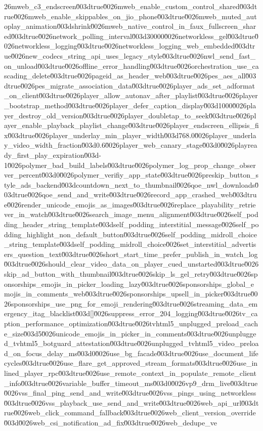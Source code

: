 {26mweb_c3_endscreen\u003dtrue\u0026mweb_enable_custom_control_shared\u003dtrue\u0026mweb_enable_skippables_on_jio_phone\u003dtrue\u0026mweb_muted_autoplay_animation\u003dshrink\u0026mweb_native_control_in_faux_fullscreen_shared\u003dtrue\u0026network_polling_interval\u003d30000\u0026networkless_gel\u003dtrue\u0026networkless_logging\u003dtrue\u0026networkless_logging_web_embedded\u003dtrue\u0026new_codecs_string_api_uses_legacy_style\u003dtrue\u0026nwl_send_fast_on_unload\u003dtrue\u0026offline_error_handling\u003dtrue\u0026orchestration_use_cascading_delete\u003dtrue\u0026pageid_as_header_web\u003dtrue\u0026pes_aes_all\u003dtrue\u0026pes_migrate_association_data\u003dtrue\u0026player_ads_set_adformat_on_client\u003dtrue\u0026player_allow_autonav_after_playlist\u003dtrue\u0026player_bootstrap_method\u003dtrue\u0026player_defer_caption_display\u003d1000\u0026player_destroy_old_version\u003dtrue\u0026player_doubletap_to_seek\u003dtrue\u0026player_enable_playback_playlist_change\u003dtrue\u0026player_endscreen_ellipsis_fix\u003dtrue\u0026player_underlay_min_player_width\u003d768.0\u0026player_underlay_video_width_fraction\u003d0.6\u0026player_web_canary_stage\u003d0\u0026playready_first_play_expiration\u003d-1\u0026polymer_bad_build_labels\u003dtrue\u0026polymer_log_prop_change_observer_percent\u003d0\u0026polymer_verifiy_app_state\u003dtrue\u0026preskip_button_style_ads_backend\u003dcountdown_next_to_thumbnail\u0026qoe_nwl_downloads\u003dtrue\u0026qoe_send_and_write\u003dtrue\u0026record_app_crashed_web\u003dtrue\u0026render_unicode_emojis_as_images\u003dtrue\u0026replace_playability_retriever_in_watch\u003dtrue\u0026search_image_menu_alignment\u003dtrue\u0026self_podding_header_string_template\u003dself_podding_interstitial_message\u0026self_podding_highlight_non_default_button\u003dtrue\u0026self_podding_midroll_choice_string_template\u003dself_podding_midroll_choice\u0026set_interstitial_advertisers_question_text\u003dtrue\u0026short_start_time_prefer_publish_in_watch_log\u003dtrue\u0026should_clear_video_data_on_player_cued_unstarted\u003dtrue\u0026skip_ad_button_with_thumbnail\u003dtrue\u0026skip_ls_gel_retry\u003dtrue\u0026sponsorships_emojis_in_picker_loading_lazy\u003dtrue\u0026sponsorships_global_emojis_in_comments_web\u003dtrue\u0026sponsorships_upsell_in_picker\u003dtrue\u0026sponsorships_use_png_for_emoji_rendering\u003dtrue\u0026streaming_data_emergency_itag_blacklist\u003d[]\u0026suppress_error_204_logging\u003dtrue\u0026tv_caption_performance_optimization\u003dtrue\u0026tvhtml5_unplugged_preload_cache_size\u003d5\u0026unicode_emojis_in_picker_in_comments\u003dtrue\u0026unplugged_tvhtml5_botguard_attestation\u003dtrue\u0026unplugged_tvhtml5_video_preload_on_focus_delay_ms\u003d0\u0026use_bg_facade\u003dtrue\u0026use_document_lifecycles\u003dtrue\u0026use_flare_get_approved_stream_formats\u003dtrue\u0026use_inlined_player_rpc\u003dtrue\u0026use_remote_context_in_populate_remote_client_info\u003dtrue\u0026variable_buffer_timeout_ms\u003d0\u0026vp9_drm_live\u003dtrue\u0026vss_final_ping_send_and_write\u003dtrue\u0026vss_pings_using_networkless\u003dtrue\u0026vss_playback_use_send_and_write\u003dtrue\u0026web_api_url\u003dtrue\u0026web_click_command_fallback\u003dtrue\u0026web_client_version_override\u003d\u0026web_csi_notification_ad_fix\u003dtrue\u0026web_dedupe_ve}

